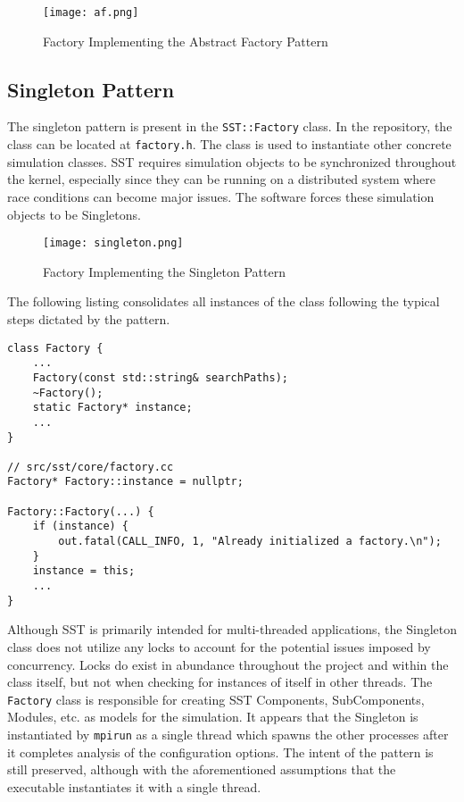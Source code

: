 \begin{figure}[h]
    \caption{Factory Implementing the Abstract Factory Pattern}
    \centering
    \texttt{[image: af.png]}
\end{figure}


\subsection{Singleton Pattern}
The singleton pattern is present in the \texttt{SST::Factory} class. In the repository, the class can be located at \texttt{factory.h}. The class is used to instantiate other concrete simulation classes. SST requires simulation objects to be synchronized throughout the kernel, especially since they can be running on a distributed system where race conditions can become major issues. The software forces these simulation objects to be Singletons.

\begin{figure}[h]
    \caption{Factory Implementing the Singleton Pattern}
    \centering
    \texttt{[image: singleton.png]}
\end{figure}

The following listing consolidates all instances of the class following the typical steps dictated by the pattern.

\begin{lstlisting}[style=customC++,label=singleton,caption=Factory Implementing the Singleton Pattern \\ File: src/sst/core/factory.h]
class Factory {
    ...
    Factory(const std::string& searchPaths);
    ~Factory();
    static Factory* instance;
    ...
}

// src/sst/core/factory.cc
Factory* Factory::instance = nullptr;

Factory::Factory(...) {
    if (instance) {
        out.fatal(CALL_INFO, 1, "Already initialized a factory.\n");
    }
    instance = this;
    ...
}
\end{lstlisting}

Although SST is primarily intended for multi-threaded applications, the Singleton class does not utilize any locks to account for the potential issues imposed by concurrency. Locks do exist in abundance throughout the project and within the class itself, but not when checking for instances of itself in other threads. The \texttt{Factory} class is responsible for creating SST Components, SubComponents, Modules, etc. as models for the simulation. It appears that the Singleton is instantiated by \texttt{mpirun} as a single thread which spawns the other processes after it completes analysis of the configuration options. The intent of the pattern is still preserved, although with the aforementioned assumptions that the executable instantiates it with a single thread.

